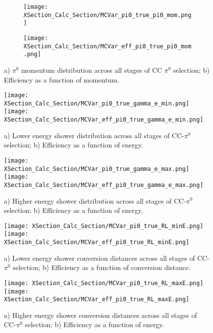 \begin{figure}[t!]
\centering
  \begin{subfigure}[t]{0.39\textwidth}
    \centering
\texttt{[image: XSection\_Calc\_Section/MCVar\_pi0\_true\_pi0\_mom.png]}
  \caption{ }
  \end{subfigure} 
  \hspace{20mm}
  \begin{subfigure}[t]{0.39\textwidth}
    \centering
\texttt{[image: XSection\_Calc\_Section/MCVar\_eff\_pi0\_true\_pi0\_mom.png]}
  \caption{ }
  \end{subfigure} 
\caption{a) $\pi^0$ momentum distribution across all stages of CC $\pi^0$ selection; b) Efficiency as a function of momentum. }
\label{fig:pi0_effs_1}
\end{figure}

\begin{figure}[h!]
\centering
\texttt{[image: XSection\_Calc\_Section/MCVar\_pi0\_true\_gamma\_e\_min.png]}
\hspace{1 mm}
\texttt{[image: XSection\_Calc\_Section/MCVar\_eff\_pi0\_true\_gamma\_e\_min.png]}
\caption{a) Lower energy shower distribution across all stages of CC-$\pi^0$ selection; b) Efficiency as a function of energy. }
\label{fig:pi0_effs_2}
\end{figure}

\begin{figure}[h!]
\centering
\texttt{[image: XSection\_Calc\_Section/MCVar\_pi0\_true\_gamma\_e\_max.png]}
\hspace{1 mm}
\texttt{[image: XSection\_Calc\_Section/MCVar\_eff\_pi0\_true\_gamma\_e\_max.png]}
\caption{a) Higher energy shower distribution across all stages of CC-$\pi^0$ selection; b) Efficiency as a function of energy. }
\label{fig:pi0_effs_3}
\end{figure}

\begin{figure}[h!]
\centering
\texttt{[image: XSection\_Calc\_Section/MCVar\_pi0\_true\_RL\_minE.png]}
\hspace{1 mm}
\texttt{[image: XSection\_Calc\_Section/MCVar\_eff\_pi0\_true\_RL\_minE.png]}
\caption{a) Lower energy shower conversion distances across all stages of CC-$\pi^0$ selection; b) Efficiency as a function of conversion distance. }
\label{fig:pi0_effs_4}
\end{figure}

\begin{figure}[h!]
\centering
\texttt{[image: XSection\_Calc\_Section/MCVar\_pi0\_true\_RL\_maxE.png]}
\hspace{1 mm}
\texttt{[image: XSection\_Calc\_Section/MCVar\_eff\_pi0\_true\_RL\_maxE.png]}
\caption{a) Higher energy shower conversion distances across all stages of CC-$\pi^0$ selection; b) Efficiency as a function of energy. }
\label{fig:pi0_effs_5}
\end{figure}


